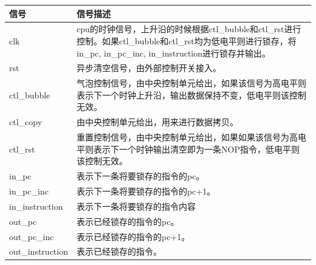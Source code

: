 \begin{center}
    \label{table:ifid}
    \begin{longtable}{p{}p{}}
        \toprule
        信号 & 信号描述 \\
        \midrule
        clk & cpu的时钟信号，上升沿的时候根据ctl\_bubble和ctl\_rst进行控制。如果ctl\_bubble和ctl\_rst均为低电平则进行锁存，将in\_pc, in\_pc\_inc, in\_instruction进行锁存并输出。 \\
        rst & 异步清空信号，由外部控制开关接入。 \\
        ctl\_bubble & 气泡控制信号，由中央控制单元给出，如果该信号为高电平则表示下一个时钟上升沿，输出数据保持不变，低电平则该控制无效。 \\
        ctl\_copy &  由中央控制单元给出，用来进行数据拷贝。\\
        ctl\_rst & 重置控制信号，由中央控制单元给出，如果如果该信号为高电平则表示下一个时钟输出清空即为一条NOP指令，低电平则该控制无效。 \\
        in\_pc & 表示下一条将要锁存的指令的pc。 \\
        in\_pc\_inc & 表示下一条将要锁存的指令的pc+1。 \\
        in\_instruction & 表示下一条将要锁存的指令内容 \\
        out\_pc & 表示已经锁存的指令的pc。 \\
        out\_pc\_inc & 表示已经锁存的指令的pc+1。 \\
        out\_instruction & 表示已经锁存的指令。 \\
        \bottomrule
    \end{longtable}
\end{center}

